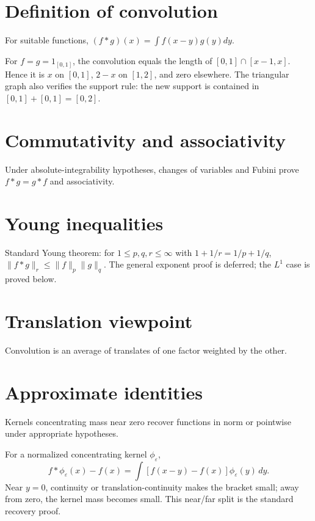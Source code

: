 \section{Definition of convolution}
For suitable functions, $(f*g)(x)=\int f(x-y)g(y)dy$.


\begin{example}\label{ex:iii10-expand-01}
For \(f=g=1_{[0,1]}\), the convolution equals the length of
\([0,1]\cap[x-1,x]\). Hence it is \(x\) on \([0,1]\), \(2-x\) on
\([1,2]\), and zero elsewhere. The triangular graph also verifies the support
rule: the new support is contained in \([0,1]+[0,1]=[0,2]\).
\end{example}
\section{Commutativity and associativity}
Under absolute-integrability hypotheses, changes of variables and Fubini prove $f*g=g*f$ and associativity.

\section{Young inequalities}
Standard Young theorem: for $1\le p,q,r\le\infty$ with $1+1/r=1/p+1/q$, $\|f*g\|_r\le\|f\|_p\|g\|_q$. The general exponent proof is deferred; the $L^1$ case is proved below.

\section{Translation viewpoint}
Convolution is an average of translates of one factor weighted by the other.

\section{Approximate identities}
Kernels concentrating mass near zero recover functions in norm or pointwise under appropriate hypotheses.


\begin{example}\label{ex:iii10-expand-02}
For a normalized concentrating kernel \(\phi_\varepsilon\),
\[
f*\phi_\varepsilon(x)-f(x)
=\int [f(x-y)-f(x)]\phi_\varepsilon(y)\,dy.
\]
Near \(y=0\), continuity or translation-continuity makes the bracket small;
away from zero, the kernel mass becomes small. This near/far split is the
standard recovery proof.
\end{example}
